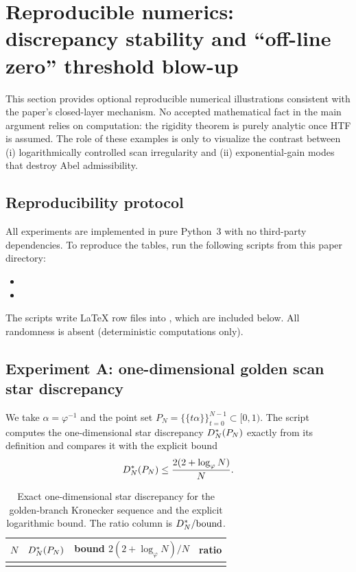 
\section{Reproducible numerics: discrepancy stability and ``off-line zero'' threshold blow-up}
\label{sec:experiments}

This section provides optional reproducible numerical illustrations consistent with the paper's closed-layer mechanism.
No accepted mathematical fact in the main argument relies on computation: the rigidity theorem is purely analytic once HTF is assumed.
The role of these examples is only to visualize the contrast between (i) logarithmically controlled scan irregularity and (ii) exponential-gain modes that destroy Abel admissibility.

\subsection{Reproducibility protocol}
\label{sec:experiments_repro}

All experiments are implemented in pure Python~3 with no third-party dependencies.
To reproduce the tables, run the following scripts from this paper directory:
\begin{itemize}
\item {}
\item {}
\end{itemize}
The scripts write \LaTeX{} row files into , which are included below.
All randomness is absent (deterministic computations only).

\subsection{Experiment A: one-dimensional golden scan star discrepancy}
\label{sec:expA_discrepancy}

We take $\alpha=\varphi^{-1}$ and the point set $P_N=\{\{t\alpha\}\}_{t=0}^{N-1}\subset[0,1)$.
The script computes the one-dimensional star discrepancy $D_N^\ast(P_N)$ exactly from its definition and compares it with the explicit bound
\[
D_N^\ast(P_N)\le \frac{2(2+\log_\varphi N)}{N}.
\]

\begin{table}[t]
\centering
\begin{tabular}{@{}rccc@{}}
\toprule
$N$ & $D_N^\ast(P_N)$ & bound $2(2+\log_\varphi N)/N$ & ratio \\
\midrule

\\
\bottomrule
\end{tabular}
\caption{Exact one-dimensional star discrepancy for the golden-branch Kronecker sequence and the explicit logarithmic bound. The ratio column is $D_N^\ast/\text{bound}$.}
\label{tab:golden_discrepancy}
\end{table}

